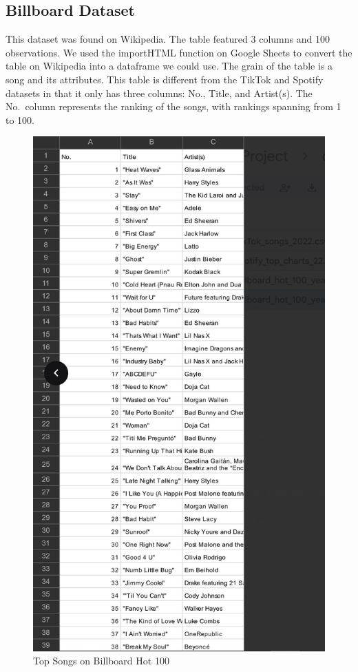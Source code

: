 \documentclass[
  letterpaper,
  DIV=11,
  numbers=noendperiod]{scrreprt}
\begin{document}
\subsection{Billboard Dataset}

This dataset was found on Wikipedia. The table featured 3 columns and
100 observations. We used the importHTML function on Google Sheets to
convert the table on Wikipedia into a dataframe we could use. The grain
of the table is a song and its attributes. This table is different from
the TikTok and Spotify datasets in that it only has three columns: No.,
Title, and Artist(s). The No.~column represents the ranking of the
songs, with rankings spanning from 1 to 100.

\begin{figure}[H]

{\centering \includegraphics{images/billboard_screenshot.jpg}

}

\caption{Top Songs on Billboard Hot 100}

\end{figure}%
\end{document}
